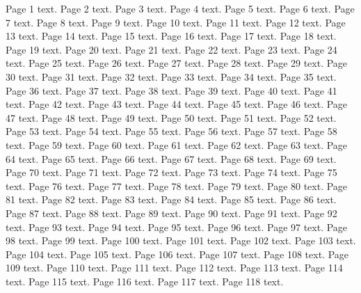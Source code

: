 \documentclass{article}
\begin{document}
Page 1 text.\newpage
Page 2 text.\newpage
Page 3 text.\newpage
Page 4 text.\newpage
Page 5 text.\newpage
Page 6 text.\newpage
Page 7 text.\newpage
Page 8 text.\newpage
Page 9 text.\newpage
Page 10 text.\newpage
Page 11 text.\newpage
Page 12 text.\newpage
Page 13 text.\newpage
Page 14 text.\newpage
Page 15 text.\newpage
Page 16 text.\newpage
Page 17 text.\newpage
Page 18 text.\newpage
Page 19 text.\newpage
Page 20 text.\newpage
Page 21 text.\newpage
Page 22 text.\newpage
Page 23 text.\newpage
Page 24 text.\newpage
Page 25 text.\newpage
Page 26 text.\newpage
Page 27 text.\newpage
Page 28 text.\newpage
Page 29 text.\newpage
Page 30 text.\newpage
Page 31 text.\newpage
Page 32 text.\newpage
Page 33 text.\newpage
Page 34 text.\newpage
Page 35 text.\newpage
Page 36 text.\newpage
Page 37 text.\newpage
Page 38 text.\newpage
Page 39 text.\newpage
Page 40 text.\newpage
Page 41 text.\newpage
Page 42 text.\newpage
Page 43 text.\newpage
Page 44 text.\newpage
Page 45 text.\newpage
Page 46 text.\newpage
Page 47 text.\newpage
Page 48 text.\newpage
Page 49 text.\newpage
Page 50 text.\newpage
Page 51 text.\newpage
Page 52 text.\newpage
Page 53 text.\newpage
Page 54 text.\newpage
Page 55 text.\newpage
Page 56 text.\newpage
Page 57 text.\newpage
Page 58 text.\newpage
Page 59 text.\newpage
Page 60 text.\newpage
Page 61 text.\newpage
Page 62 text.\newpage
Page 63 text.\newpage
Page 64 text.\newpage
Page 65 text.\newpage
Page 66 text.\newpage
Page 67 text.\newpage
Page 68 text.\newpage
Page 69 text.\newpage
Page 70 text.\newpage
Page 71 text.\newpage
Page 72 text.\newpage
Page 73 text.\newpage
Page 74 text.\newpage
Page 75 text.\newpage
Page 76 text.\newpage
Page 77 text.\newpage
Page 78 text.\newpage
Page 79 text.\newpage
Page 80 text.\newpage
Page 81 text.\newpage
Page 82 text.\newpage
Page 83 text.\newpage
Page 84 text.\newpage
Page 85 text.\newpage
Page 86 text.\newpage
Page 87 text.\newpage
Page 88 text.\newpage
Page 89 text.\newpage
Page 90 text.\newpage
Page 91 text.\newpage
Page 92 text.\newpage
Page 93 text.\newpage
Page 94 text.\newpage
Page 95 text.\newpage
Page 96 text.\newpage
Page 97 text.\newpage
Page 98 text.\newpage
Page 99 text.\newpage
Page 100 text.\newpage
Page 101 text.\newpage
Page 102 text.\newpage
Page 103 text.\newpage
Page 104 text.\newpage
Page 105 text.\newpage
Page 106 text.\newpage
Page 107 text.\newpage
Page 108 text.\newpage
Page 109 text.\newpage
Page 110 text.\newpage
Page 111 text.\newpage
Page 112 text.\newpage
Page 113 text.\newpage
Page 114 text.\newpage
Page 115 text.\newpage
Page 116 text.\newpage
Page 117 text.\newpage
Page 118 text.\newpage
\end{document}

